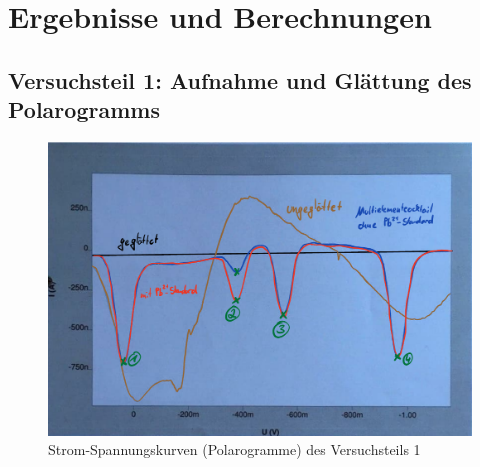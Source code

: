 \section{Ergebnisse und Berechnungen}
\label{sec:ergebnisse}
\subsection{Versuchsteil 1: Aufnahme und Glättung des Polarogramms}
 
 \begin{figure}[h!]
 	\centering
 	\includegraphics[width=1.0\textwidth]{img/Daten_farbig2}
 	\caption{Strom-Spannungskurven (Polarogramme) des Versuchsteils 1}
 	\label{fig:daten_farbig}
 \end{figure}
 \FloatBarrier
   

